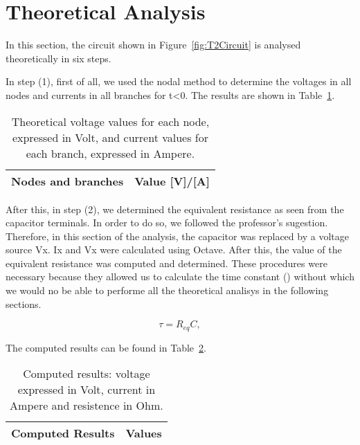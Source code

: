 \section{Theoretical Analysis}
\label{sec:analysis}

In this section, the circuit shown in Figure~\ref{fig:T2Circuit} is analysed theoretically in six steps.

In step (1), first of all, we used the nodal method to determine the voltages in all nodes and currents in all branches for t<0. The results are shown in Table~\ref{tab:TA1}.

\begin{table}[h]
  \centering
  \begin{tabular}{|l|r|}
    \hline    
    {\bf Nodes and branches} & {\bf Value [V]/[A]} \\ \hline
    
  \end{tabular}
  \caption{Theoretical voltage values for each node, expressed in Volt, and current values for each branch, expressed in Ampere.}
  \label{tab:TA1}
\end{table}

After this, in step (2), we determined the equivalent resistance as seen from the capacitor terminals. In order to do so, we followed the professor's sugestion. Therefore, in this section of the analysis, the capacitor was replaced by a voltage source Vx. Ix and Vx were calculated using Octave. After this, the value of the equivalent resistance was computed and determined. These procedures were necessary because they allowed us to calculate the time constant (\tau) without which we would no be able to performe all the theoretical analisys in the following sections. 

\begin{equation}
  \tau = R_{eq}C,
  \label{eq:tau}
\end{equation}


The computed results can be found in Table~\ref{tab:TA2}.

\begin{table}[h]
  \centering
  \begin{tabular}{|l|r|}
    \hline    
    {\bf Computed Results} & {\bf Values} \\ \hline
    
  \end{tabular}
  \caption{Computed results: voltage expressed in Volt, current in Ampere and resistence in Ohm.}
  \label{tab:TA2}
\end{table}

